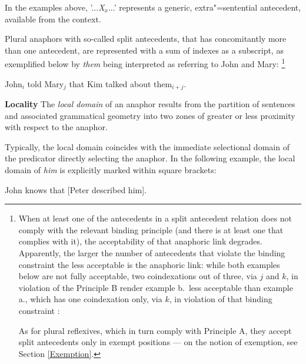 \documentclass[output=paper
	        ,collection
	        ,collectionchapter
 	        ,biblatex
                ,babelshorthands
                ,newtxmath
                ,draftmode
                ,colorlinks, citecolor=brown
]{langscibook}
\begin{document}
In the examples above, '...{\em X}$_{x}$...' represents a generic, extra"=sentential
antecedent, available from the context.

Plural anaphors with so-called split antecedents, that has concomitantly
more than one antecedent, are represented with a sum of indexes as a subscript, as exemplified
below by {\em them} being interpreted as referring to John and Mary:%
\footnote{
When at least one of the antecedents in a split antecedent relation does not comply
with the relevant binding principle (and there is at least one that complies with it), 
the acceptability of that anaphoric link degrades. Apparently, the larger the number 
of antecedents that violate the binding constraint the less acceptable
is the anaphoric link: while both examples below are not fully acceptable,
two coindexations out of three, via $j$ and $k$,  in violation of the Principle B
render example b.~less acceptable than example a., which has one coindexation 
only, via $k$, in violation of that binding constraint  \citep[313]{seeley93}:

\begin{exe}
\ex
\begin{xlist}
\end{xlist}
\end{exe}

As for plural reflexives, which in turn comply with Principle A, they accept split antecedents only in exempt 
positions --- on the notion of exemption, see Section \ref{Exemption}.}

\begin{exe}
\ex John$_{i}$ told Mary$_{j}$ that Kim talked about them$_{i+j}$.
\end{exe}


\textbf{Locality} The {\em local domain} of an anaphor results from
the partition of sentences and associated grammatical geometry into two
zones of greater or less proximity with respect to the anaphor.

Typically, the local domain coincides with the immediate selectional domain
of the predicator directly selecting the anaphor. In the following example, 
the local domain of {\em him} is explicitly marked within square brackets: 


\begin{exe}
\ex John knows that [Peter described him].
\end{exe}
\end{document}

